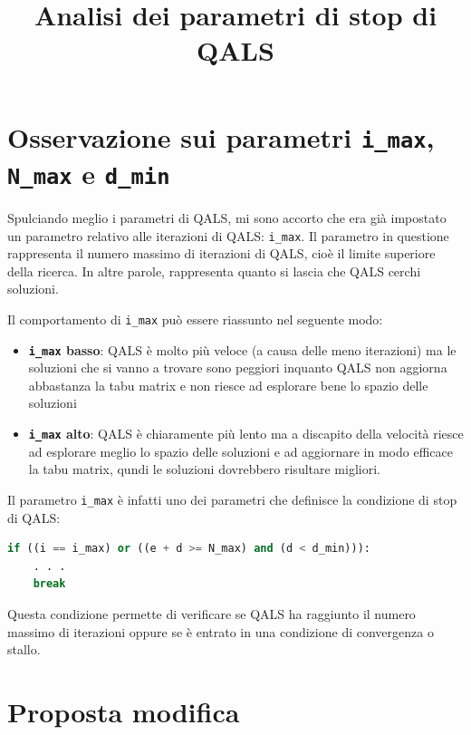 \documentclass[a4paper,12pt]{article}
\title{Analisi dei parametri di stop di QALS}
\author{}
\date{}
\begin{document}
\maketitle

\section{Osservazione sui parametri \texttt{i\_max}, \texttt{N\_max} e \texttt{d\_min}}

Spulciando meglio i parametri di QALS, mi sono accorto che era già impostato un parametro relativo alle iterazioni di QALS: \texttt{i\_max}. 
Il parametro in questione rappresenta il numero massimo di iterazioni di QALS, cioè il limite superiore della ricerca. In altre parole, rappresenta quanto si lascia che QALS cerchi soluzioni.

Il comportamento di \texttt{i\_max} può essere riassunto nel seguente modo:

\begin{itemize}[leftmargin=1.5cm]
    \item \textbf{\texttt{i\_max} basso}: QALS è molto più veloce (a causa delle meno iterazioni) ma le soluzioni che si vanno a trovare 
                                          sono peggiori inquanto QALS non aggiorna abbastanza la tabu matrix e non riesce ad esplorare bene
                                          lo spazio delle soluzioni

    \item \textbf{\texttt{i\_max} alto}: QALS è chiaramente più lento ma a discapito della velocità riesce ad esplorare meglio lo spazio delle
                                         soluzioni e ad aggiornare in modo efficace la tabu matrix, qundi le soluzioni dovrebbero risultare migliori.
\end{itemize}

Il parametro \texttt{i\_max} è infatti uno dei parametri che definisce la condizione di stop di QALS:

\begin{lstlisting}[language=Python]
if ((i == i_max) or ((e + d >= N_max) and (d < d_min))):
    . . .
    break
\end{lstlisting}

Questa condizione permette di verificare se QALS ha raggiunto il numero massimo di iterazioni oppure 
se è entrato in una condizione di convergenza o stallo.

\section{Proposta modifica}
\end{document}
